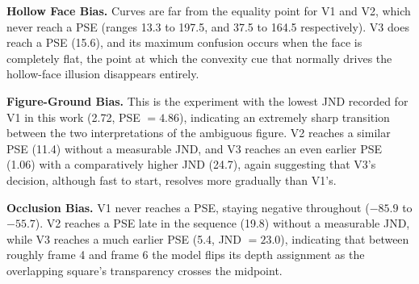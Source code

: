 \documentclass[10pt,twocolumn]{article}
\begin{document}
\textbf{Hollow Face Bias.} Curves are far from the equality point for V1 and V2, which
never reach a PSE (ranges 13.3 to 197.5, and 37.5 to 164.5 respectively). V3 does reach a
PSE (15.6), and its maximum confusion occurs when the face is completely flat, the point
at which the convexity cue that normally drives the hollow-face illusion disappears
entirely.

\textbf{Figure-Ground Bias.} This is the experiment with the lowest JND recorded for V1
in this work (2.72, PSE $=4.86$), indicating an extremely sharp transition between the
two interpretations of the ambiguous figure. V2 reaches a similar PSE (11.4) without a
measurable JND, and V3 reaches an even earlier PSE (1.06) with a comparatively higher
JND (24.7), again suggesting that V3's decision, although fast to start, resolves more
gradually than V1's. \newline

\textbf{Occlusion Bias.} V1 never reaches a PSE, staying negative throughout ($-85.9$ to
$-55.7$). V2 reaches a PSE late in the sequence (19.8) without a measurable JND, while V3
reaches a much earlier PSE (5.4, JND $=23.0$), indicating that between roughly frame 4
and frame 6 the model flips its depth assignment as the overlapping square's transparency
crosses the midpoint.
\end{document}
